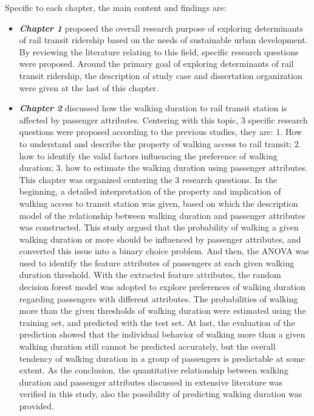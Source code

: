 Specific to each chapter, the main content and findings are:
\begin{itemize}
	\item \emph{\textbf{Chapter 1}} proposed the overall research purpose of exploring determinants of rail transit ridership based on the needs of sustainable urban development. By reviewing the literature relating to this field, specific research questions were proposed. Around the primary goal of exploring determinants of rail transit ridership, the description of study case and dissertation organization were given at the last of this chapter.
	
	
	\item \emph{\textbf{Chapter 2}} discussed how the walking duration to rail transit station is affected by passenger attributes. Centering with this topic, 3 specific research questions were proposed according to the previous studies, they are: 1. How to understand and describe the property of walking access to rail transit; 2. how to identify the valid factors influencing the preference of walking duration; 3. how to estimate the walking duration using passenger attributes. This chapter was organized centering the 3 research questions. In the beginning, a detailed interpretation of the property and implication of walking access to transit station was given, based on which the description model of the relationship between walking duration and passenger attributes was constructed. This study argued that the probability of walking a given walking duration or more should be influenced by passenger attributes, and converted this issue into a binary choice problem. And then, the ANOVA was used to identify the feature attributes of passengers at each given walking duration threshold. With the extracted feature attributes, the random decision forest model was adopted to explore preferences of walking duration regarding passengers with different attributes. The probabilities of walking more than the given thresholds of walking duration were estimated using the training set, and predicted with the test set. At last, the evaluation of the prediction showed that the individual behavior of walking more than a given walking duration still cannot be predicted accurately, but the overall tendency of walking duration in a group of passengers is predictable at some extent. As the conclusion, the quantitative relationship between walking duration and passenger attributes discussed in extensive literature was verified in this study, also the possibility of predicting walking duration was provided.
	

\end{itemize}

